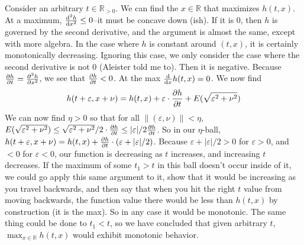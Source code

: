 \documentclass[12pt]{article}
\def\mbb#1{\mathbb{#1}}
\def\bR{\mbb{R}}
\theoremstyle{definition}
\theoremstyle{remark}
\newcommand{\mg}[1]{\| #1 \|}
\newcommand{\ve}{\varepsilon}
\begin{document}
\begin{enumerate}[leftmargin=\labelsep]
		Consider an arbitrary $t \in \bR_{>0}$. We can find the $x \in \bR$ that maximizes $h(t, x)$. At a maximum, $\dv[2]{h}{x} \leq 0$--it must be concave down (ish). If it is 0, then $h$ is governed by the second derivative, and the argument is almost the same, except with more algebra. In the case where $h$ is constant around $(t, x)$, it is certainly monotonically decreasing. Ignoring this case, we only consider the case where the second derivative is not 0 (Aleister told me to). Then it is negative. Because $\pdv{h}{t} = \pdv[2]{h}{x}$, we see that $\pdv{h}{t} < 0$. At the max $\dv{x} h(t, x) = 0$. We now find 
		\begin{align*}
			h(t+\ve, x+\nu) = h(t, x) + \ve \cdot \pdv{h}{t} + E(\sqrt{\ve^2+\nu^2}) 
		\end{align*}
		We can now find $\eta > 0$ so that for all $\mg{(\ve, \nu)} < \eta$, $E(\sqrt{\ve^2+\nu^2}) \leq \sqrt{\ve^2+\nu^2}/2 \cdot \pdv{h}{t} \leq |\ve|/2 \pdv{h}{t}$. So in our $\eta$-ball, $h(t+\ve, x+\nu) = h(t, x) + \pdv{h}{t} \cdot (\ve+|\ve|/2)$. Because $\ve+|\ve|/2 > 0$ for $\ve > 0$, and $< 0$ for $\ve < 0$, our function is decreasing as $t$ increases, and increasing $t$ decreases. If the maximum of some $t_1 > t$ in this ball doesn't occur inside of it, we could go apply this same argument to it, show that it would be increasing as you travel backwards, and then say that when you hit the right $t$ value from moving backwards, the function value there would be less than $h(t, x)$ by construction (it is the max). So in any case it would be monotonic. The same thing could be done to $t_1 < t$, so we have concluded that given arbitrary $t$, $\max_{x \in \bR} h(t, x)$ would exhibit monotonic behavior.
		

\end{enumerate}
\end{document}
